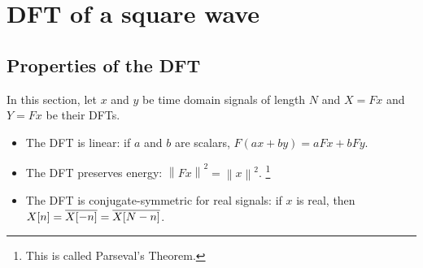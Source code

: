 \chapter{DFT of a square wave}
\section{Properties of the DFT}
In this section, let \(x\) and \(y\) be time domain signals of length \(N\) and \(X = Fx\) and \(Y = Fx\) be their DFTs.
\begin{itemize}
  \item The DFT is linear: if \(a\) and \(b\) are scalars, \(F(ax + by) = aFx + bFy\).
  \item The DFT preserves energy: \(\left\|Fx\right\|^2 = \left\|x\right\|^2\).
  \footnote{This is called Parseval's Theorem.}
  \item The DFT is conjugate-symmetric for real signals: if \(x\) is real, then \(X[n] = \overline{X[-n]} = \overline{X[N - n]} \).
\end{itemize}


